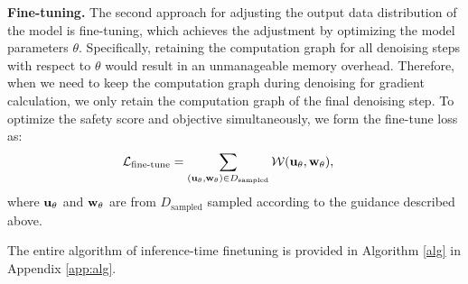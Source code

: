 \textbf{Fine-tuning.} The second approach for adjusting the output data distribution of the model is fine-tuning, which achieves the adjustment by optimizing the model parameters $\theta$. Specifically, retaining the computation graph for all denoising steps with respect to $\theta$ would result in an unmanageable memory overhead. Therefore, when we need to keep the computation graph during denoising for gradient calculation, we only retain the computation graph of the final denoising step. To optimize the safety score and  objective simultaneously, we form the fine-tune loss as:
\begin{equation}
\begin{aligned}
    &\mathcal{L}_{\text{fine-tune}} = \sum_{(\mathbf{u}_\theta,\mathbf{w}_\theta)\in D_{\text{sampled}}}\mathcal{W}(\mathbf{u}_\theta,\mathbf{w}_\theta),
    \label{eq:finetune}
\end{aligned}
\end{equation}
where $\mathbf{u}_\theta$ and $\mathbf{w}_\theta$ are from $D_\text{sampled}$ sampled according to the guidance described above.

The entire algorithm of inference-time finetuning is provided in Algorithm \ref{alg} in Appendix \ref{app:alg}.

